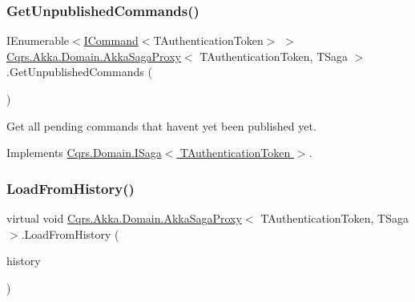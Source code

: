 \subsubsection{\texorpdfstring{Get\+Unpublished\+Commands()}{GetUnpublishedCommands()}}
{\footnotesize\ttfamily I\+Enumerable$<$\hyperlink{interfaceCqrs_1_1Commands_1_1ICommand}{I\+Command}$<$T\+Authentication\+Token$>$ $>$ \hyperlink{classCqrs_1_1Akka_1_1Domain_1_1AkkaSagaProxy}{Cqrs.\+Akka.\+Domain.\+Akka\+Saga\+Proxy}$<$ T\+Authentication\+Token, T\+Saga $>$.Get\+Unpublished\+Commands (\begin{DoxyParamCaption}{ }\end{DoxyParamCaption})}



Get all pending commands that haven\textquotesingle{}t yet been published yet. 



Implements \hyperlink{interfaceCqrs_1_1Domain_1_1ISaga_abba76d72857107a14328c8b555f3883f_abba76d72857107a14328c8b555f3883f}{Cqrs.\+Domain.\+I\+Saga$<$ T\+Authentication\+Token $>$}.

\mbox{\label{classCqrs_1_1Akka_1_1Domain_1_1AkkaSagaProxy_a21b69799b046c1fcdf5b2443699dee0c_a21b69799b046c1fcdf5b2443699dee0c}} 
\subsubsection{\texorpdfstring{Load\+From\+History()}{LoadFromHistory()}}
{\footnotesize\ttfamily virtual void \hyperlink{classCqrs_1_1Akka_1_1Domain_1_1AkkaSagaProxy}{Cqrs.\+Akka.\+Domain.\+Akka\+Saga\+Proxy}$<$ T\+Authentication\+Token, T\+Saga $>$.Load\+From\+History (\begin{DoxyParamCaption}\item[{I\+Enumerable$<$ \hyperlink{interfaceCqrs_1_1Events_1_1ISagaEvent}{I\+Saga\+Event}$<$ T\+Authentication\+Token $>$$>$}]{history }\end{DoxyParamCaption})\hspace{0.3cm}{\ttfamily [virtual]}}



